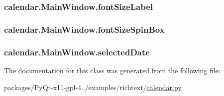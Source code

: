 \subsubsection[{font\+Size\+Label}]{\setlength{\rightskip}{0pt plus 5cm}calendar.\+Main\+Window.\+font\+Size\+Label}\label{classcalendar_1_1MainWindow_aa58796607b886bb623c64a934ae8857d}
\hypertarget{classcalendar_1_1MainWindow_a820c6b2c2b916f902ab33d32200be906}{}
\subsubsection[{font\+Size\+Spin\+Box}]{\setlength{\rightskip}{0pt plus 5cm}calendar.\+Main\+Window.\+font\+Size\+Spin\+Box}\label{classcalendar_1_1MainWindow_a820c6b2c2b916f902ab33d32200be906}
\hypertarget{classcalendar_1_1MainWindow_ad5fd9491f07a610973de49cd835bf035}{}
\subsubsection[{selected\+Date}]{\setlength{\rightskip}{0pt plus 5cm}calendar.\+Main\+Window.\+selected\+Date}\label{classcalendar_1_1MainWindow_ad5fd9491f07a610973de49cd835bf035}


The documentation for this class was generated from the following file\+:\begin{DoxyCompactItemize}
\item 
packages/\+Py\+Qt-\/x11-\/gpl-\/4../examples/richtext/\hyperlink{calendar_8py}{calendar.\+py}\end{DoxyCompactItemize}

